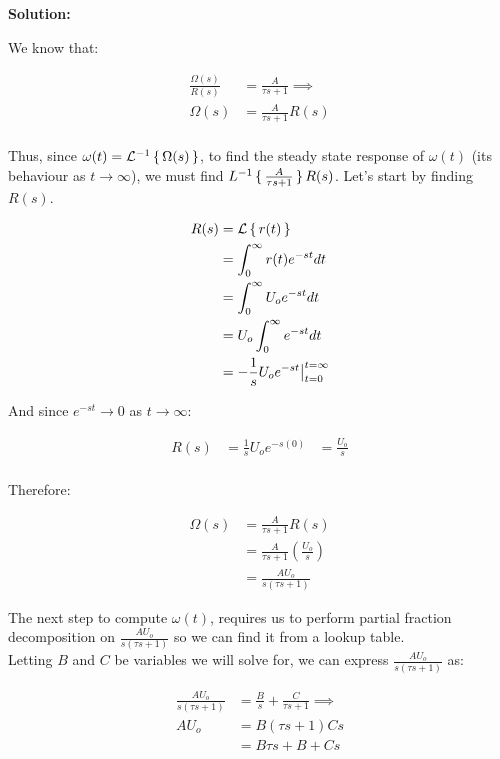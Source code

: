 \documentclass[10pt]{article}
\newenvironment{solution}{
	\vspace{1em}\par\large\textbf{{Solution:}}\par\vspace{1em}
}{
	\vspace{1em}
}
\newcounter{step}
\begin{document}
\begin{solution}
	We know that:

	\begin{align*}
		\frac{\Omega(s)}{R(s)} &= \frac{A}{\tau{s} + 1} \implies \\
		\Omega(s) &= \frac{A}{\tau{s} + 1}R(s) \\
	\end{align*}

	Thus, since $\omega(t) = \mathcal{L}^{-1}\set{\Omega(s)}$, to find the
	steady state response of $\omega(t)$ (its behaviour as $t \rightarrow
	\infty$), we must find $L^{-1}\set{\frac{A}{\tau{s} + 1}}R(s)$. Let's
	start by finding $R(s)$.

	\begin{align*}
		R(s) &= \mathcal{L}\set{r(t)} \\
		&= \int_{0}^{\infty}r(t)e^{-st}dt \\
		&= \int_{0}^{\infty}U_{o}e^{-st}dt \\
		&= U_{o}\int_{0}^{\infty}e^{-st}dt \\
		&= -\frac{1}{s}U_{o}e^{-st} \big|_{t = 0}^{t = \infty} \\
	\end{align*}

	And since $e^{-st} \rightarrow 0$ as $t \rightarrow \infty$:

	\begin{align*}
		R(s) &= \frac{1}{s}U_{o}e^{-s(0)}
		&= \frac{U_{o}}{s} \\
	\end{align*}

	Therefore:

	\begin{align*}
		\Omega(s) &= \frac{A}{\tau{s} + 1}R(s) \\
		&= \frac{A}{\tau{s} + 1}\left( \frac{U_{o}}{s} \right) \\
		&= \frac{AU_{o}}{s(\tau{s} + 1)}
	\end{align*}

	The next step to compute $\omega(t)$, requires us to perform partial
	fraction decomposition on $\frac{AU_{o}}{s(\tau{s} + 1)}$ so we can
	find it from a lookup table. \\

	Letting $B$ and $C$ be variables we will solve for, we can express $\frac{AU_{o}}{s(\tau{s} + 1)}$ as:

	\begin{align*}
		\frac{AU_{o}}{s(\tau{s} + 1)} &= \frac{B}{s} + \frac{C}{\tau{s} + 1} \implies \\
		AU_{o} &= B(\tau{s} + 1) Cs \\
		&= B\tau{s} + B + Cs \\
	\end{align*}


\end{solution}
\end{document}
